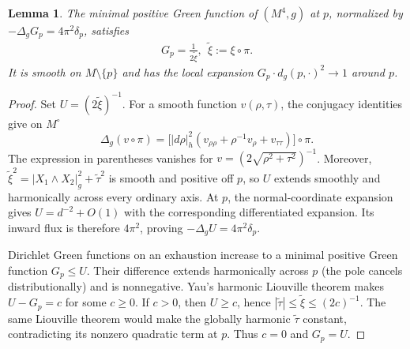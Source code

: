 \documentclass[letterpaper]{amsart}
\newtheorem{lem}[thm]{Lemma}
\theoremstyle{definition}
\theoremstyle{remark}
\begin{document}
\begin{lem}\label{lem-green}
The minimal positive Green function of $(M^4, g)$ at $p$, normalized by $- \Delta _{g} G_p = 4 \pi ^2 \delta _p$, satisfies
	\begin{align*}
		G_{p} = \frac{1}{2 \tilde{\xi } }, \ \ \tilde{\xi }:= \xi \circ \pi.
	\end{align*} 
	It is smooth on $M \setminus \{ p\} $ and has the local expansion $G_p \cdot d_g(p, \cdot ) ^2 \to 1$ around $p$.
\end{lem} 
\begin{proof}
Set $U=(2\tilde\xi)^{-1}$. For a smooth function $v(\rho,\tau)$, the conjugacy identities give on $M^\circ$
\[
 \Delta_g(v\circ\pi)
 =\bigl[|d\rho|_h^2(v_{\rho\rho}+\rho^{-1}v_\rho+v_{\tau\tau})\bigr]\circ\pi.
\]
The expression in parentheses vanishes for $v=(2\sqrt{\rho^2+\tau^2})^{-1}$. Moreover, $\tilde\xi^2=|X_1\wedge X_2|_g^2+\tilde\tau^2$ is smooth and positive off $p$, so $U$ extends smoothly and harmonically across every ordinary axis. At $p$, the normal-coordinate expansion gives $U=d^{-2}+O(1)$ with the corresponding differentiated expansion. Its inward flux is therefore $4\pi^2$, proving $-\Delta_gU=4\pi^2\delta_p$.

Dirichlet Green functions on an exhaustion increase to a minimal positive Green function $G_p\le U$. Their difference extends harmonically across $p$ (the pole cancels distributionally) and is nonnegative. Yau's harmonic Liouville theorem \cite{notes-Yau} makes $U-G_p=c$ for some $c\ge0$. If $c>0$, then $U\ge c$, hence $|\tilde\tau|\le\tilde\xi\le(2c)^{-1}$. The same Liouville theorem would make the globally harmonic $\tilde\tau$ constant, contradicting its nonzero quadratic term at $p$. Thus $c=0$ and $G_p=U$.
\end{proof}
\end{document}

